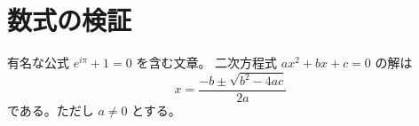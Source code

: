 \documentclass{jlreq}
\begin{document}
\section{数式の検証}
有名な公式 $e^{i\pi} + 1 = 0$ を含む文章。
二次方程式 $ax^2 + bx + c = 0$ の解は
\[
  x = \frac{-b \pm \sqrt{b^2 - 4ac}}{2a}
\]
である。ただし $a \neq 0$ とする。
\end{document}
